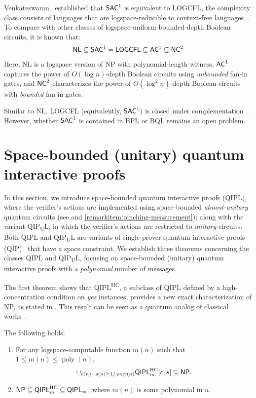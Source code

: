 \documentclass[11pt, a4paper]{article}
\numberwithin{equation}{section}
\numberwithin{figure}{section}
\newcommand{\NP}{\textnormal{\textsf{NP}}\xspace}
\newcommand{\QIP}{\textnormal{\textsf{QIP}}\xspace}
\newcommand{\QIPL}{\textnormal{\textsf{QIPL}}\xspace}
\newcommand{\QIPUL}{\texorpdfstring{\textnormal{\textsf{QIP}\textsubscript{\textnormal{U}}\textsf{L}}}\xspace}
\newcommand{\QIPLHC}{\texorpdfstring{\textnormal{\textsf{QIPL}\textsuperscript{\textnormal{HC}}}}\xspace}
\newcommand{\HC}{\mathrm{HC}}
\newcommand{\BPL}{\textnormal{\textsf{BPL}}\xspace}
\newcommand{\BQL}{\textnormal{\textsf{BQL}}\xspace}
\newcommand{\SAC}{\textnormal{\textsf{SAC}}\xspace}
\newcommand{\AC}{\textnormal{\textsf{AC}}\xspace}
\newcommand{\NC}{\textnormal{\textsf{NC}}\xspace}
\newcommand{\NL}{\textnormal{\textsf{NL}}\xspace}
\newcommand{\LOGCFL}{\textnormal{\textsf{LOGCFL}}\xspace}
\DeclareMathOperator\poly{poly}
\begin{document}
Venkateswaran~\cite{Venkateswaran87} established that $\SAC^1$ is equivalent to \LOGCFL{}, the complexity class consists of languages that are logspace-reducible to context-free languages~\cite{Sudborough78}. 
To compare with other classes of logspace-uniform bounded-depth Boolean circuits, it is known that:
\[\NL \subseteq \SAC^1 = \LOGCFL \subseteq \AC^1 \subseteq \NC^2\] 
Here, \NL{} is a logspace version of \NP{} with polynomial-length witness, $\AC^1$ captures the power of $O(\log{n})$-depth Boolean circuits using \textit{unbounded} fan-in gates, and $\NC^2$ characterizes the power of $O(\log^2{n})$-depth Boolean circuits with \textit{bounded} fan-in gates. 

Similar to \NL{}, \LOGCFL{} (equivalently, $\SAC^1$) is closed under complementation~\cite{BCD+89}. However, whether $\SAC^1$ is contained in \BPL{} or \BQL{} remains an open problem. 

\section{Space-bounded (unitary) quantum interactive proofs}
\label{sec:poly-message-QIPL}

In this section, we introduce space-bounded quantum interactive proofs (\QIPL{}), where the verifier's actions are implemented using space-bounded \textit{almost-unitary} quantum circuits (see  and \ref{remarkitem:pinching-measurement}); along with the variant \QIPUL{}, in which the verifier's actions are restricted to \textit{unitary} circuits. Both \QIPL{} and \QIPUL{} are variants of single-prover quantum interactive proofs (\QIP{})~\cite{Wat99QIP,KW00} that have a space constraint. We establish three theorems concerning the classes \QIPL{} and \QIPUL{}, focusing on space-bounded (unitary) quantum interactive proofs with a \textit{polynomial} number of messages. 

The first theorem shows that \QIPLHC{}, a subclass of \QIPL{} defined by a high-concentration condition on \textit{yes} instances, provides a new exact characterization of \NP{}, as stated in . 
This result can be seen as a quantum analog of classical works~\cite{Lipton90,CL95}. 

\begin{theorem}[The equivalence of \QIPLHC{} and \NP]
    \label{thm:QIPL-eq-NP}
    The following holds: 
    \begin{enumerate}[label={\upshape(\arabic*)}, topsep=0.33em, itemsep=0.33em, parsep=0.33em]
        \item For any logspace-computable function $m(n)$ such that $1 \leq m(n) \leq \poly(n)$,  
        \[\cup_{c(n)-s(n) \geq 1/\poly(n)}\QIPL^\HC_m[c,s] \subseteq \NP.\]
        \label{thmitem:QIPLHC-in-NP}
        \item $\NP \subseteq \QIPL^\HC_m \subseteq \QIPL_m$, where $m(n)$ is some polynomial in $n$.
    \end{enumerate}
\end{theorem}
\end{document}
